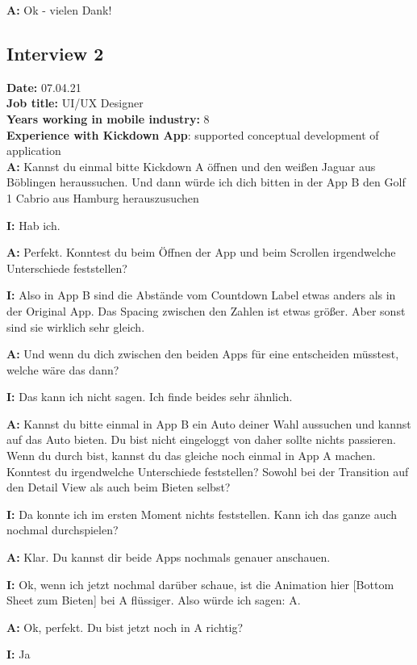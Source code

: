 \begin{myparindent}{0pt}
\textbf{A:} Ok - vielen Dank!


\subsection{Interview 2}
\textbf{Date:} 07.04.21\\
\textbf{Job title:} UI/UX Designer\\
\textbf{Years working in mobile industry:} 8\\
\textbf{Experience with Kickdown App}: supported conceptual development of application\\

\textbf{A:}  Kannst du einmal bitte Kickdown A öffnen und den weißen Jaguar aus Böblingen heraussuchen. Und dann würde ich dich bitten in der App B den Golf 1 Cabrio aus Hamburg herauszusuchen

\textbf{I:} Hab ich.

\textbf{A:} Perfekt. Konntest du beim Öffnen der App und beim Scrollen irgendwelche Unterschiede feststellen?

\textbf{I:} Also in App B sind die Abstände vom Countdown Label etwas anders als in der Original App. Das Spacing zwischen den Zahlen ist etwas größer. Aber sonst sind sie wirklich sehr gleich. 

\textbf{A:} Und wenn du dich zwischen den beiden Apps für eine entscheiden müsstest, welche wäre das dann?

\textbf{I:} Das kann ich nicht sagen. Ich finde beides sehr ähnlich.

\textbf{A:} Kannst du bitte einmal in App B ein Auto deiner Wahl aussuchen und kannst auf das Auto bieten. Du bist nicht eingeloggt von daher sollte nichts passieren. Wenn du durch bist, kannst du das gleiche noch einmal in App A machen. Konntest du irgendwelche Unterschiede feststellen? Sowohl bei der Transition auf den Detail View als auch beim Bieten selbst?

\textbf{I:} Da konnte ich im ersten Moment nichts feststellen. Kann ich das ganze auch nochmal durchspielen?

\textbf{A:} Klar. Du kannst dir beide Apps nochmals genauer anschauen.

\textbf{I:} Ok, wenn ich jetzt nochmal darüber schaue, ist die Animation hier [Bottom Sheet zum Bieten] bei A flüssiger. Also würde ich sagen: A.

\textbf{A:} Ok, perfekt. Du bist jetzt noch in A richtig?

\textbf{I:} Ja


\end{myparindent}
